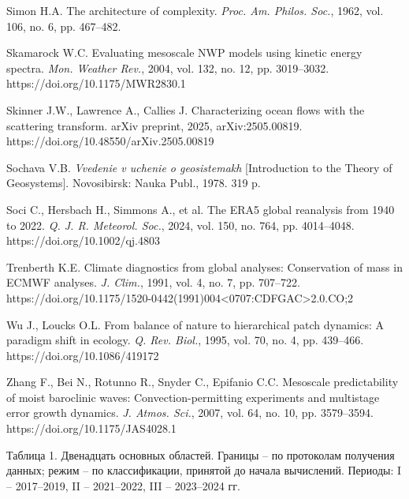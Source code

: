 \documentclass[12pt,a4paper]{article}
\begin{document}
\noindent Simon H.A. The architecture of complexity. \textit{Proc. Am. Philos. Soc.}, 1962, vol. 106, no. 6, pp. 467–482.

\noindent Skamarock W.C. Evaluating mesoscale NWP models using kinetic energy spectra. \textit{Mon. Weather Rev.}, 2004, vol. 132, no. 12, pp. 3019–3032.\\ https://doi.org/10.1175/MWR2830.1

\noindent Skinner J.W., Lawrence A., Callies J. Characterizing ocean flows with the scattering transform. arXiv preprint, 2025, arXiv:2505.00819.\\ https://doi.org/10.48550/arXiv.2505.00819

\noindent Sochava V.B. \textit{Vvedenie v uchenie o geosistemakh} [Introduction to the Theory of Geosystems]. Novosibirsk: Nauka Publ., 1978. 319 p.

\noindent Soci C., Hersbach H., Simmons A., et al. The ERA5 global reanalysis from 1940 to 2022. \textit{Q. J. R. Meteorol. Soc.}, 2024, vol. 150, no. 764, pp. 4014–4048.\\ https://doi.org/10.1002/qj.4803

\noindent Trenberth K.E. Climate diagnostics from global analyses: Conservation of mass in ECMWF analyses. \textit{J. Clim.}, 1991, vol. 4, no. 7, pp. 707–722.\\ https://doi.org/10.1175/1520-0442(1991)004<0707:CDFGAC>2.0.CO;2

\noindent Wu J., Loucks O.L. From balance of nature to hierarchical patch dynamics: A paradigm shift in ecology. \textit{Q. Rev. Biol.}, 1995, vol. 70, no. 4, pp. 439–466.\\ https://doi.org/10.1086/419172

\noindent Zhang F., Bei N., Rotunno R., Snyder C., Epifanio C.C. Mesoscale predictability of moist baroclinic waves: Convection-permitting experiments and multistage error growth dynamics. \textit{J. Atmos. Sci.}, 2007, vol. 64, no. 10, pp. 3579–3594.\\ https://doi.org/10.1175/JAS4028.1

\clearpage
\noindent Таблица 1. Двенадцать основных областей. Границы -- по протоколам получения данных; режим -- по классификации, принятой до начала вычислений. Периоды: I -- 2017--2019, II -- 2021--2022, III -- 2023--2024 гг.
\end{document}
